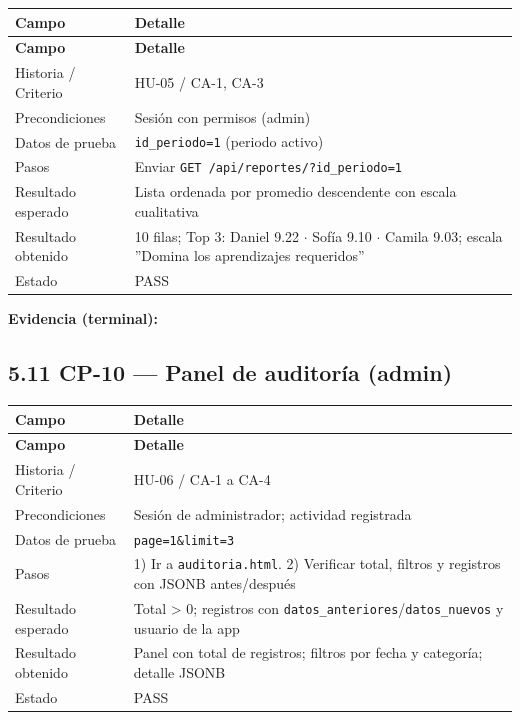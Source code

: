 \documentclass[11pt,a4paper]{article}
\begin{document}
{\small
\begin{longtable}{|p{}|p{}|}
\rowcolor{UTECblue}\color{white}\bfseries Campo & \color{white}\bfseries Detalle \\ \hline
\endfirsthead
\rowcolor{UTECblue}\color{white}\bfseries Campo & \color{white}\bfseries Detalle \\ \hline
\endhead
Historia / Criterio & HU-05 / CA-1, CA-3 \\ \hline
Precondiciones & Sesión con permisos (admin) \\ \hline
Datos de prueba & \texttt{id\_periodo=1} (periodo activo) \\ \hline
Pasos & Enviar \texttt{GET /api/reportes/?id\_periodo=1} \\ \hline
Resultado esperado & Lista ordenada por promedio descendente con escala cualitativa \\ \hline
Resultado obtenido & 10 filas; Top 3: Daniel 9.22 {$\cdot$} Sofía 9.10 {$\cdot$} Camila 9.03; escala ''Domina los aprendizajes requeridos'' \\ \hline
Estado & {\color{green!60!black}{$\checkmark$}} PASS \\ \hline
\end{longtable}}


\textbf{Evidencia (terminal):}


\subsection*{5.11 CP-10 --- Panel de auditoría (admin)}


{\small
\begin{longtable}{|p{}|p{}|}
\rowcolor{UTECblue}\color{white}\bfseries Campo & \color{white}\bfseries Detalle \\ \hline
\endfirsthead
\rowcolor{UTECblue}\color{white}\bfseries Campo & \color{white}\bfseries Detalle \\ \hline
\endhead
Historia / Criterio & HU-06 / CA-1 a CA-4 \\ \hline
Precondiciones & Sesión de administrador; actividad registrada \\ \hline
Datos de prueba & \texttt{page=1\&limit=3} \\ \hline
Pasos & 1) Ir a \texttt{auditoria.html}. 2) Verificar total, filtros y registros con JSONB antes/después \\ \hline
Resultado esperado & Total > 0; registros con \texttt{datos\_anteriores}/\texttt{datos\_nuevos} y usuario de la app \\ \hline
Resultado obtenido & Panel con total de registros; filtros por fecha y categoría; detalle JSONB \\ \hline
Estado & {\color{green!60!black}{$\checkmark$}} PASS \\ \hline
\end{longtable}}
\end{document}
